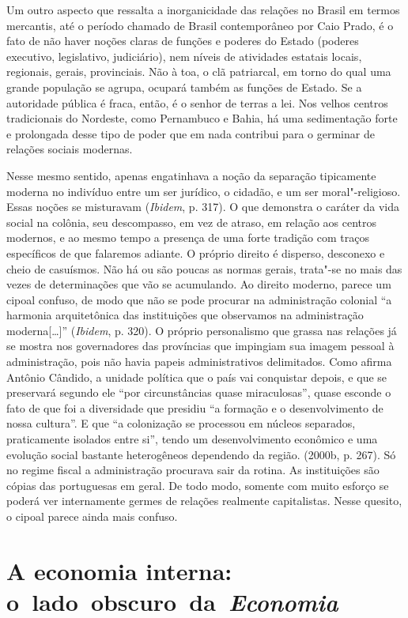 {Um outro aspecto que ressalta a inorganicidade das relações no Brasil em
termos mercantis, até o período chamado de Brasil contemporâneo por Caio
Prado, é o fato de não haver noções claras de funções e poderes do
Estado (poderes executivo, legislativo, judiciário), nem níveis de
atividades estatais locais, regionais, gerais, provinciais. Não à toa, o
clã patriarcal, em torno do qual uma grande população se agrupa, ocupará
também as funções de Estado. Se a autoridade pública é fraca, então, é o
senhor de terras a lei. Nos velhos centros tradicionais do Nordeste,
como Pernambuco e Bahia, há uma sedimentação forte e prolongada desse
tipo de poder que em nada contribui para o germinar de relações sociais
modernas.

Nesse mesmo sentido, apenas engatinhava a noção da separação tipicamente
moderna no indivíduo entre um ser jurídico, o cidadão, e um ser
moral"-religioso. Essas noções se misturavam (\emph{Ibidem}, p. 317). O
que demonstra o caráter da vida social na colônia, seu descompasso, em
vez de atraso, em relação aos centros modernos, e ao mesmo tempo a
presença de uma forte tradição com traços específicos de que falaremos
adiante. O próprio direito é disperso, desconexo e cheio de casuísmos.
Não há ou são poucas as normas gerais, trata"-se no mais das vezes de
determinações que vão se acumulando. Ao direito moderno, parece um
cipoal confuso, de modo que não se pode procurar na administração
colonial ``a harmonia arquitetônica das instituições que observamos na
administração moderna[\ldots{}]'' (\emph{Ibidem}, p. 320). O próprio
personalismo que grassa nas relações já se mostra nos governadores das
províncias que impingiam sua imagem pessoal à administração, pois não
havia papeis administrativos delimitados. Como afirma Antônio Cândido, a
unidade política que o país vai conquistar depois, e que se preservará
segundo ele ``por circunstâncias quase miraculosas'', quase esconde o
fato de que foi a diversidade que presidiu ``a formação e o
desenvolvimento de nossa cultura''. E que ``a colonização se processou
em núcleos separados, praticamente isolados entre si'', tendo um
desenvolvimento econômico e uma evolução social bastante heterogêneos
dependendo da região. (2000b, p. 267). Só no regime fiscal a
administração procurava sair da rotina. As instituições são cópias das
portuguesas em geral. De todo modo, somente com muito esforço se poderá ver
internamente germes de relações realmente capitalistas. Nesse quesito, o
cipoal parece ainda mais confuso.

\section{A economia interna: o~lado~obscuro~da~\emph{Economia}}

}
